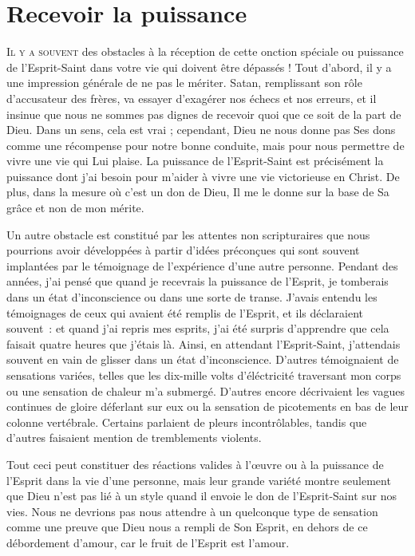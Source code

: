 \chapter{Recevoir la puissance}

\lettrine{I}{l y a souvent} des obstacles à la réception de cette onction
 spéciale ou puissance de l'Esprit-Saint dans votre vie qui doivent
 être dépassés ! Tout d'abord, il y a une impression générale
 de ne pas le mériter. Satan,  remplissant son rôle d'accusateur
 des frères, va essayer d'exagérer nos échecs et nos erreurs,
 et il insinue que nous ne sommes pas dignes de recevoir quoi que ce soit
 de la part de Dieu. Dans un sens, cela est vrai ;
 cependant, Dieu ne nous donne pas Ses dons comme une récompense
 pour notre bonne conduite, mais pour nous permettre de vivre une vie
 qui Lui plaise. La puissance de l'Esprit-Saint est précisément
 la puissance dont j'ai besoin pour m'aider à vivre une vie victorieuse
 en Christ. De plus, dans la mesure où c'est un don de Dieu,
 Il me le donne sur la base de Sa grâce et non de mon mérite.

Un autre obstacle est constitué par les attentes non scripturaires
 que nous pourrions avoir développées à partir d'idées préconçues
 qui sont souvent implantées par le témoignage de l'expérience 
 d'une autre personne. Pendant des années, j'ai pensé que
 quand je recevrais la puissance de l'Esprit, je tomberais dans un état
 d'inconscience ou dans une sorte de transe.
 J'avais entendu les témoignages de ceux qui avaient été remplis de l'Esprit,
 et ils déclaraient souvent~: \Og [\dots{}] et quand j'ai repris mes esprits,
 j'ai été surpris d'apprendre que cela faisait quatre heures
 que j'étais là. \Fg{}
 Ainsi, en attendant l'Esprit-Saint, j'attendais souvent en vain
 de glisser dans un état d'inconscience.
 D'autres témoignaient de sensations variées, telles que
 \Og les dix-mille volts d'éléctricité traversant mon corps \Fg{} ou
 \Og une sensation de chaleur m'a submergé. \Fg{}
 D'autres encore décrivaient les vagues continues de gloire déferlant
 sur eux ou la sensation de picotements en bas de leur colonne vertébrale.
 Certains parlaient de pleurs incontrôlables,
 tandis que d'autres faisaient mention de tremblements violents.

Tout ceci peut constituer des réactions valides à l'œuvre
 ou à la puissance de l'Esprit dans la vie d'une personne,
 mais leur grande variété montre seulement que Dieu n'est pas lié
 à un style quand il envoie le don de l'Esprit-Saint sur nos vies.
 Nous ne devrions pas nous attendre à un quelconque type de sensation
 comme une preuve que Dieu nous a rempli de Son Esprit,
 en dehors de ce débordement d'amour, car le fruit de l'Esprit est l'amour.

